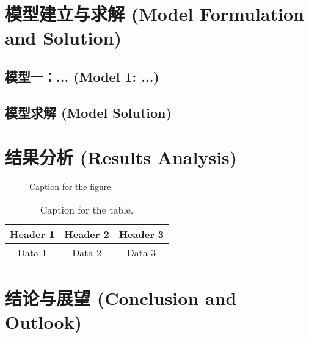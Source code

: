 \documentclass[withoutpreface,bwprint]{cumcm} %
\begin{document}
\section{模型建立与求解 (Model Formulation and Solution)}
\subsection{模型一：... (Model 1: ...)}

\subsection{模型求解 (Model Solution)}

\section{结果分析 (Results Analysis)}
\begin{figure}[htbp]
    \centering
    \caption{Caption for the figure.}
    \label{fig:example_figure}
\end{figure}

\begin{table}[htbp]
    \centering
    \caption{Caption for the table.}
    \label{tab:example_table}
    \begin{tabular}{ccc}
        \toprule
        Header 1 & Header 2 & Header 3 \\
        \midrule
        Data 1 & Data 2 & Data 3 \\
        \bottomrule
    \end{tabular}
\end{table}

\section{结论与展望 (Conclusion and Outlook)}
\end{document}
